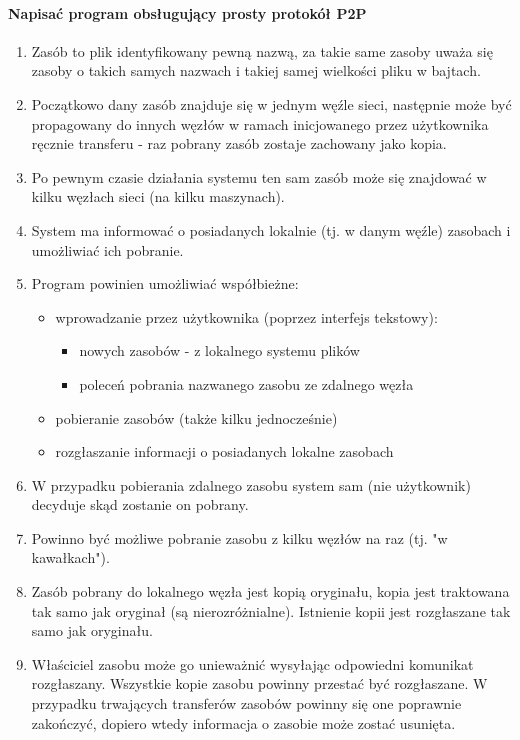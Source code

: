 \documentclass[11pt,oneside]{book}
\newcommand{\+}{\discretionary{\mbox{\scriptsize$\hookleftarrow$}}{}{}}
\begin{document}
\paragraph{Napisać program obsługujący prosty protokół P2P}
\begin{enumerate}
\item
Zasób to plik identyfikowany pewną nazwą, za takie same zasoby uważa się zasoby o takich samych nazwach i takiej samej wielkości pliku w bajtach.
\item
Początkowo dany zasób znajduje się w jednym węźle sieci, następnie może być propagowany do innych węzłów w ramach inicjowanego przez użytkownika ręcznie transferu - raz pobrany zasób zostaje zachowany jako kopia.
\item
Po pewnym czasie działania systemu ten sam zasób może się znajdować w kilku węzłach sieci (na kilku maszynach).
\item
System ma informować o posiadanych lokalnie (tj. w danym węźle) zasobach i umożliwiać ich pobranie.
\item
Program powinien umożliwiać współbieżne:
\begin{itemize}
\item
wprowadzanie przez użytkownika (poprzez interfejs tekstowy):
\begin{itemize}
\item
nowych zasobów - z lokalnego systemu plików
\item
poleceń pobrania nazwanego zasobu ze zdalnego węzła
\end{itemize}
\item
pobieranie zasobów (także kilku jednocześnie)
\item
rozgłaszanie informacji o posiadanych lokalne zasobach
\end{itemize}
\item
W przypadku pobierania zdalnego zasobu system sam (nie użytkownik) decyduje skąd zostanie on pobrany.
\item
Powinno być możliwe pobranie zasobu z kilku węzłów na raz (tj. "w kawałkach").
\item
Zasób pobrany do lokalnego węzła jest kopią oryginału, kopia jest traktowana tak samo jak oryginał (są nierozróżnialne). Istnienie kopii jest rozgłaszane tak samo jak oryginału.
\item
Właściciel zasobu może go unieważnić wysyłając odpowiedni komunikat rozgłaszany. Wszystkie kopie zasobu powinny przestać być rozgłaszane. W przypadku trwających transferów zasobów powinny się one poprawnie zakończyć, dopiero wtedy informacja o zasobie może zostać usunięta.
\end{enumerate}
\end{document}
